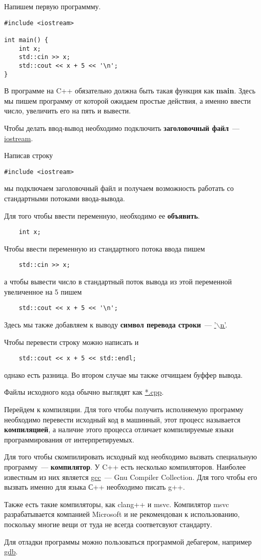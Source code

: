 Напишем первую программму.

\begin{verbatim}
#include <iostream>

int main() {
    int x;
    std::cin >> x;
    std::cout << x + 5 << '\n';
}
\end{verbatim}


В программе на C++ обязательно должна быть такая функция как \textbf{main}.
Здесь мы пишем программу от которой ожидаем простые действия, а именно ввести число, увеличить его на пять и вывести.

Чтобы делать ввод-вывод необходимо подключить \textbf{заголовочный файл}~--- \underline{iostream}.

Написав строку 
\begin{verbatim}
#include <iostream>
\end{verbatim}
мы подключаем заголовочный файл и получаем возможность работать со стандартными потоками ввода-вывода.

Для того чтобы ввести переменную, необходимо ее \textbf{объявить}. 
\begin{verbatim}
    int x;
\end{verbatim}

Чтобы ввести переменную из стандартного потока ввода пишем
\begin{verbatim}
    std::cin >> x;
\end{verbatim}

а чтобы вывести число в стандартный поток вывода из этой переменной увеличенное на 5 пишем
\begin{verbatim}
    std::cout << x + 5 << '\n';
\end{verbatim}

Здесь мы также добавляем к выводу \textbf{символ перевода строки}~--- \underline{'$\backslash$n'}.

Чтобы перевести строку можно написать и 
\begin{verbatim}
    std::cout << x + 5 << std::endl;
\end{verbatim}

однако есть разница. Во втором случае мы также отчищаем буффер вывода.

Файлы исходного кода обычно выглядят как \underline{*.cpp}.

Перейдем к компиляции. Для того чтобы получить исполняемую программу необходимо 
перевести исходный код в машинный, этот процесс называется \textbf{компиляцией}, а
наличие этого процесса отличает компилируемые языки программирования от интерпретируемых.

Для того чтобы скомпилировать исходный код необходимо вызвать специальную программу~--- \textbf{компилятор}.
У C++ есть несколько компиляторов. Наиболее известным из них является \underline{gcc}~--- Gnu Compiler Collection.
Для того чтобы его вызвать именно для языка С++ необходимо писать g++.

Также есть такие компиляторы, как clang++ и msvc.
Компилятор msvc разрабатывается компанией Microsoft и не рекомендован к использованию,
поскольку многие вещи от туда не всегда соответсвуют стандарту.

Для отладки программы можно пользоваться программой дебагером, например \underline{gdb}.